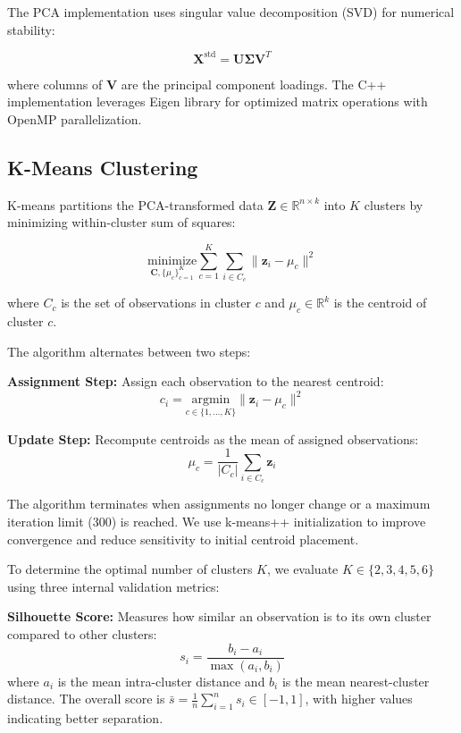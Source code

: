 \documentclass[11pt]{article}
\begin{document}
The PCA implementation uses singular value decomposition (SVD) for numerical stability:

\begin{equation}
\mathbf{X}^{\text{std}} = \mathbf{U} \mathbf{\Sigma} \mathbf{V}^T
\end{equation}

where columns of $\mathbf{V}$ are the principal component loadings. The C++ implementation leverages Eigen library for optimized matrix operations with OpenMP parallelization.

\subsection{K-Means Clustering}

K-means partitions the PCA-transformed data $\mathbf{Z} \in \mathbb{R}^{n \times k}$ into $K$ clusters by minimizing within-cluster sum of squares:

\begin{equation}
\underset{\mathbf{C}, \{\mu_c\}_{c=1}^{K}}{\text{minimize}} \sum_{c=1}^{K} \sum_{i \in C_c} \|\mathbf{z}_i - \mu_c\|^2
\end{equation}

where $C_c$ is the set of observations in cluster $c$ and $\mu_c \in \mathbb{R}^k$ is the centroid of cluster $c$.

The algorithm alternates between two steps:

\textbf{Assignment Step:} Assign each observation to the nearest centroid:
\begin{equation}
c_i = \underset{c \in \{1,\ldots,K\}}{\text{argmin}} \|\mathbf{z}_i - \mu_c\|^2
\end{equation}

\textbf{Update Step:} Recompute centroids as the mean of assigned observations:
\begin{equation}
\mu_c = \frac{1}{|C_c|} \sum_{i \in C_c} \mathbf{z}_i
\end{equation}

The algorithm terminates when assignments no longer change or a maximum iteration limit (300) is reached. We use k-means++ initialization \cite{arthur2007k} to improve convergence and reduce sensitivity to initial centroid placement.

To determine the optimal number of clusters $K$, we evaluate $K \in \{2, 3, 4, 5, 6\}$ using three internal validation metrics:

\textbf{Silhouette Score:} Measures how similar an observation is to its own cluster compared to other clusters:
\begin{equation}
s_i = \frac{b_i - a_i}{\max(a_i, b_i)}
\end{equation}
where $a_i$ is the mean intra-cluster distance and $b_i$ is the mean nearest-cluster distance. The overall score is $\bar{s} = \frac{1}{n} \sum_{i=1}^{n} s_i \in [-1, 1]$, with higher values indicating better separation.
\end{document}
